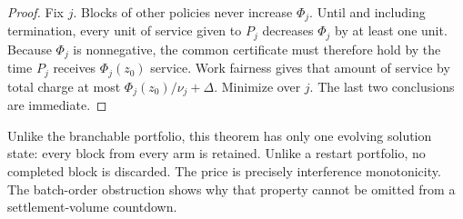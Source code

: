 \begin{proof}
Fix $j$.  Blocks of other policies never increase $\Phi_j$.  Until
and including termination, every unit of service given to $P_j$ decreases
$\Phi_j$ by at least one unit.  Because $\Phi_j$ is nonnegative, the common
certificate must therefore hold by the time $P_j$ receives
$\Phi_j(z_0)$ service.  Work
fairness gives that amount of service by total charge at most
$\Phi_j(z_0)/\nu_j+\Delta$.  Minimize over $j$.  The last two conclusions are
immediate.
\end{proof}

Unlike the branchable portfolio, this theorem has only one evolving solution
state: every block from every arm is retained.  Unlike a restart portfolio,
no completed block is discarded.  The price is precisely
interference monotonicity.  The batch-order obstruction shows why that
property cannot be omitted from a settlement-volume countdown.
